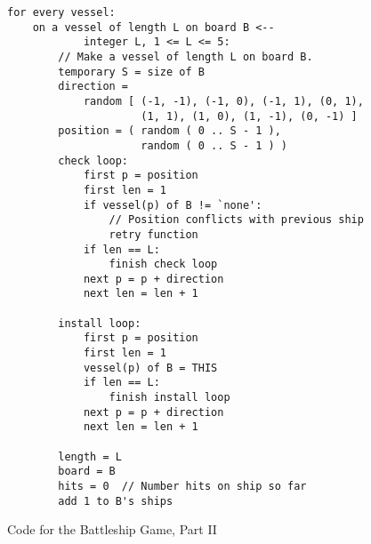 \documentclass[12pt]{article}
\newlength{\figurewidth}
\newenvironment{boxedfigure}[1][!btp]%
	{\begin{figure*}[#1]
	 \begin{lrbox}{\figurebox}
	 \begin{minipage}{\figurewidth}

	 \vspace*{1ex}}%
	{
	 \vspace*{1ex}

	 \end{minipage}
	 \end{lrbox}
	 \begin{center}
	 \fbox{\hspace*{0.1in}\usebox{\figurebox}\hspace*{0.1in}}
	 \end{center}
	 \end{figure*}}
\begin{document}
\begin{boxedfigure}

\small

\begin{verbatim}
for every vessel:
    on a vessel of length L on board B <--
            integer L, 1 <= L <= 5:
        // Make a vessel of length L on board B.
        temporary S = size of B
        direction =
            random [ (-1, -1), (-1, 0), (-1, 1), (0, 1),
                     (1, 1), (1, 0), (1, -1), (0, -1) ]
        position = ( random ( 0 .. S - 1 ),
                     random ( 0 .. S - 1 ) )
        check loop:
            first p = position
            first len = 1
            if vessel(p) of B != `none':
                // Position conflicts with previous ship
                retry function
            if len == L:
                finish check loop
            next p = p + direction
            next len = len + 1

        install loop:
            first p = position
            first len = 1
            vessel(p) of B = THIS
            if len == L:
                finish install loop
            next p = p + direction
            next len = len + 1

        length = L
        board = B
        hits = 0  // Number hits on ship so far
        add 1 to B's ships
\end{verbatim}

\caption{Code for the Battleship Game, Part II}
\label{CODE-FOR-BATTLESHIP-2}
\end{boxedfigure}
\end{document}
